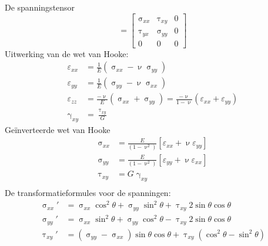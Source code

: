                 De spanningstensor
                \begin{equation}
                    [\sigma] = \left[\begin{matrix}
                        \upsigma_{xx} & \uptau_{xy} & 0 \\
                        \uptau_{yx} & \upsigma_{yy} & 0 \\
                        0 & 0 & 0
                    \end{matrix}\right]
                \end{equation}
                Uitwerking van de wet van Hooke:
                \begin{align}
                    \varepsilon_{xx} &= \frac{1}{E}\left(\upsigma_{xx} - \upnu\upsigma_{yy}\right)\nonumber\\
                    \varepsilon_{yy} &= \frac{1}{E}\left(\upsigma_{yy} - \upnu\upsigma_{xx}\right)\nonumber\\
                    \varepsilon_{zz} &= \frac{-\upnu}{E}\left(\upsigma_{xx}+\upsigma_{yy}\right) = \frac{-\upnu}{1-\upnu}\left(\varepsilon_{xx}+\varepsilon_{yy}\right)\\
                    \upgamma_{xy} &= \frac{\uptau_{xy}}{G}\nonumber
                \end{align}
                Geïnverteerde wet van Hooke
                \begin{align}
                    \upsigma_{xx} &= \frac{E}{(1-\upnu^2)}\left[\varepsilon_{xx}+\upnu\varepsilon_{yy}\right]\nonumber\\
                    \upsigma_{yy} &= \frac{E}{(1-\upnu^2)}\left[\varepsilon_{yy}+\upnu\varepsilon_{xx}\right]\\
                    \uptau_{xy} &= G\upgamma_{xy}\nonumber\\
                \end{align}
                De transformatieformules voor de spanningen:
                \begin{align}
                    \upsigma_{xx}' &= \upsigma_{xx}\cos^2\theta+\upsigma_{yy}\sin^2\theta + \uptau_{xy}2\sin\theta\cos\theta\nonumber\\
                    \upsigma_{yy}' &= \upsigma_{xx}\sin^2\theta+\upsigma_{yy}\cos^2\theta - \uptau_{xy}2\sin\theta\cos\theta\\
                    \uptau_{xy}' &= (\upsigma_{yy}-\upsigma_{xx})\sin\theta\cos\theta + \uptau_{xy}\left(\cos^2\theta - \sin^2\theta\right)\nonumber
                \end{align}
